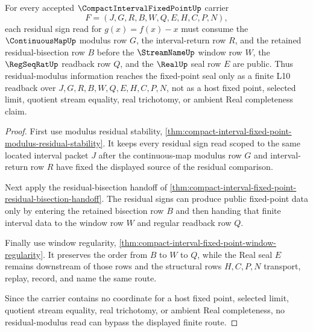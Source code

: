 \begin{theorem}
\label{thm:compact-interval-fixed-point-residual-modulus-readback}
For every accepted $\CompactIntervalFixedPointUp$ carrier
$$
F=(J,G,R,B,W,Q,E,H,C,P,N),
$$
each residual sign read for $g(x)=f(x)-x$ must consume the $\ContinuousMapUp$ modulus row $G$, the interval-return row $R$, and the retained residual-bisection row $B$ before the $\StreamNameUp$ window row $W$, the $\RegSeqRatUp$ readback row $Q$, and the $\RealUp$ seal row $E$ are public. Thus residual-modulus information reaches the fixed-point seal only as a finite L10 readback over $J,G,R,B,W,Q,E,H,C,P,N$, not as a host fixed point, selected limit, quotient stream equality, real trichotomy, or ambient Real completeness claim.
\end{theorem}
\begin{proof}
First use modulus residual stability, \autoref{thm:compact-interval-fixed-point-modulus-residual-stability}. It keeps every residual sign read scoped to the same located interval packet $J$ after the continuous-map modulus row $G$ and interval-return row $R$ have fixed the displayed source of the residual comparison.

Next apply the residual-bisection handoff of \autoref{thm:compact-interval-fixed-point-residual-bisection-handoff}. The residual signs can produce public fixed-point data only by entering the retained bisection row $B$ and then handing that finite interval data to the window row $W$ and regular readback row $Q$.

Finally use window regularity, \autoref{thm:compact-interval-fixed-point-window-regularity}. It preserves the order from $B$ to $W$ to $Q$, while the Real seal $E$ remains downstream of those rows and the structural rows $H,C,P,N$ transport, replay, record, and name the same route.

Since the carrier contains no coordinate for a host fixed point, selected limit, quotient stream equality, real trichotomy, or ambient Real completeness, no residual-modulus read can bypass the displayed finite route.
\end{proof}

